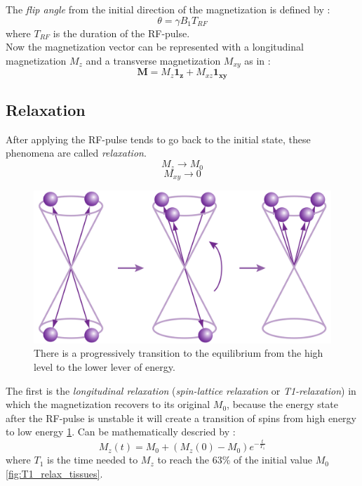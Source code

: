  \noindent The \emph{flip angle} from the initial direction of the magnetization is defined by \cite{slides}:
 \[\theta = \gamma B_{1}T_{RF}\]
 where $T_{RF}$ is the duration of the RF-pulse.\\
 Now the magnetization vector can be represented with a longitudinal magnetization $M_z$ and a transverse magnetization $M_{xy}$ as in \cite{slides}:
 \begin{equation}
    \mathbf{M}=M_{z}\mathbf{1_{z}}+M_{xz}\mathbf{1_{xy}}
 \end{equation}

 \subsection{Relaxation}
 After applying the RF-pulse tends to go back to the initial state, these phenomena are called \emph{relaxation}. 
 \[M_{z} \rightarrow M_{0}\]
 \[M_{xy} \rightarrow 0 \]

 \begin{figure}[h]
   \centering
   \begin{minipage}[c]{0.5\textwidth}
      \includegraphics[width=\textwidth]{images/t1_relax_energy.png}
   \end{minipage}\hfill
   \begin{minipage}[b]{0.45\textwidth}
      \caption{There is a progressively transition to the equilibrium from the high level to the lower lever of energy. \cite{KastlerVetterIRM}}
      \label{fig:T1_relax_energy}
   \end{minipage}
 \end{figure}

 The first is the \emph{longitudinal relaxation} (\emph{spin-lattice relaxation} or \emph{T1-relaxation}) in which the magnetization recovers to its original $M_0$, because the energy state after the RF-pulse is unstable it will create a transition of spins from high energy to low energy \ref{fig:T1_relax_energy}. Can be mathematically descried by \cite{slides}:
 \begin{equation}
    M_{z}(t)=M_{0}+(M_{z}(0)-M_{0})e^{-\frac{t}{T_{1}}}
 \end{equation}
 where $T_1$ is the time needed to $M_{z}$ to reach the $63\%$ of the initial value $M_{0}$ \ref{fig:T1_relax_tissues}.
 
